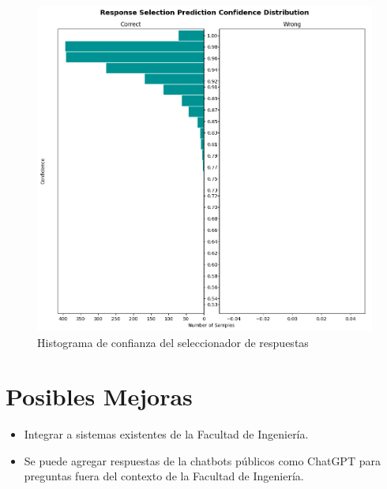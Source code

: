 \begin{figure}[H]
	\centering
	\includegraphics[width=\textwidth]{imagenes/cap5/response_selection_histogram.png}
	\caption{Histograma de confianza del seleccionador de respuestas}
	\label{fig:response_histograma}
\end{figure}

\section{Posibles Mejoras}
\begin{itemize}
	\item Integrar a sistemas existentes de la Facultad de Ingeniería.
	\item Se puede agregar respuestas de la chatbots públicos como	ChatGPT \cite{api_chatgpt}
	      para preguntas
	      fuera del
	      contexto de la Facultad de Ingeniería.
\end{itemize}
